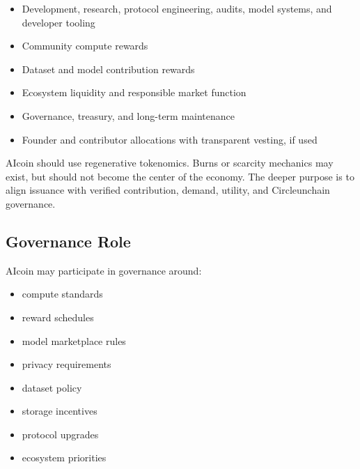 ﻿\documentclass[12pt]{article}
\begin{document}
\begin{itemize}
  \item Development, research, protocol engineering, audits, model systems, and developer tooling
\end{itemize}
\begin{itemize}
  \item Community compute rewards
\end{itemize}
\begin{itemize}
  \item Dataset and model contribution rewards
\end{itemize}
\begin{itemize}
  \item Ecosystem liquidity and responsible market function
\end{itemize}
\begin{itemize}
  \item Governance, treasury, and long-term maintenance
\end{itemize}
\begin{itemize}
  \item Founder and contributor allocations with transparent vesting, if used
\end{itemize}

AIcoin should use regenerative tokenomics. Burns or scarcity mechanics may exist, but should not become the center of the economy. The deeper purpose is to align issuance with verified contribution, demand, utility, and Circleunchain governance.

\subsection{Governance Role}


AIcoin may participate in governance around:

\begin{itemize}
  \item compute standards
\end{itemize}
\begin{itemize}
  \item reward schedules
\end{itemize}
\begin{itemize}
  \item model marketplace rules
\end{itemize}
\begin{itemize}
  \item privacy requirements
\end{itemize}
\begin{itemize}
  \item dataset policy
\end{itemize}
\begin{itemize}
  \item storage incentives
\end{itemize}
\begin{itemize}
  \item protocol upgrades
\end{itemize}
\begin{itemize}
  \item ecosystem priorities
\end{itemize}
\end{document}
